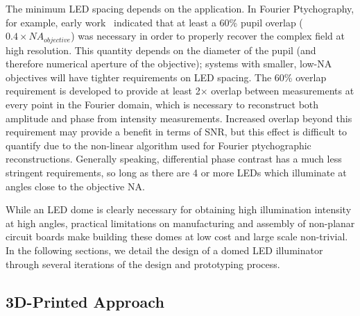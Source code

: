 The minimum LED spacing depends on the application. In Fourier Ptychography, for example, early work~\cite{Zheng2013, Tian14, Guo:15} indicated that at least a 60\% pupil overlap ($0.4 \times NA_{objective}$) was necessary in order to properly recover the complex field at high resolution. This quantity depends on the diameter of the pupil (and therefore numerical aperture of the objective); systems with smaller, low-NA objectives will have tighter requirements on LED spacing. The 60\% overlap requirement is developed to provide at least 2$\times$ overlap between measurements at every point in the Fourier domain, which is necessary to reconstruct both amplitude and phase from intensity measurements. Increased overlap beyond this requirement may provide a benefit in terms of SNR, but this effect is difficult to quantify due to the non-linear algorithm used for Fourier ptychographic reconstructions. Generally speaking, differential phase contrast has a much less stringent requirements, so long as there are 4 or more LEDs which illuminate at angles close to the objective NA.

While an LED dome is clearly necessary for obtaining high illumination intensity at high angles, practical limitations on manufacturing and assembly of non-planar circuit boards make building these domes at low cost and large scale non-trivial. In the following sections, we detail the design of a domed LED illuminator through several iterations of the design and prototyping process.

\subsection{3D-Printed Approach}\label{sec:fabrication:ccsdome}

